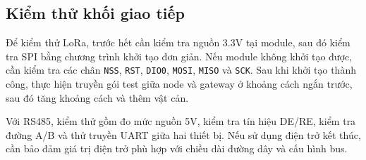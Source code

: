 \subsection{Kiểm thử khối giao tiếp}
Để kiểm thử LoRa, trước hết cần kiểm tra nguồn 3.3V tại module, sau đó kiểm tra SPI bằng chương trình khởi tạo đơn giản. Nếu module không khởi tạo được, cần kiểm tra các chân \texttt{NSS}, \texttt{RST}, \texttt{DIO0}, \texttt{MOSI}, \texttt{MISO} và \texttt{SCK}. Sau khi khởi tạo thành công, thực hiện truyền gói test giữa node và gateway ở khoảng cách ngắn trước, sau đó tăng khoảng cách và thêm vật cản.

Với RS485, kiểm thử gồm đo mức nguồn 5V, kiểm tra tín hiệu DE/RE, kiểm tra đường A/B và thử truyền UART giữa hai thiết bị. Nếu sử dụng điện trở kết thúc, cần bảo đảm giá trị điện trở phù hợp với chiều dài đường dây và cấu hình bus.
